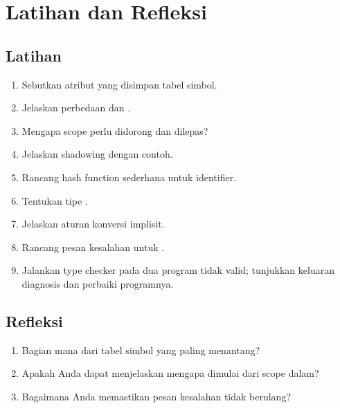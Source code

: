\section*{Latihan dan Refleksi}

\subsection*{Latihan}
\begin{enumerate}[label=\arabic*.,leftmargin=*]
  \item Sebutkan atribut yang disimpan tabel simbol.
  \item Jelaskan perbedaan  dan .
  \item Mengapa scope perlu didorong dan dilepas?
  \item Jelaskan shadowing dengan contoh.
  \item Rancang hash function sederhana untuk identifier.
  \item Tentukan tipe .
  \item Jelaskan aturan konversi implisit.
  \item Rancang pesan kesalahan untuk .
  \item Jalankan type checker pada dua program tidak valid; tunjukkan
        keluaran diagnosis dan perbaiki programnya.
\end{enumerate}

\subsection*{Refleksi}
\begin{reflectionbox}
\begin{enumerate}[label=\arabic*.,leftmargin=*]
  \item Bagian mana dari tabel simbol yang paling menantang?
  \item Apakah Anda dapat menjelaskan mengapa  dimulai
        dari scope dalam?
  \item Bagaimana Anda memastikan pesan kesalahan tidak berulang?
\end{enumerate}
\end{reflectionbox}
